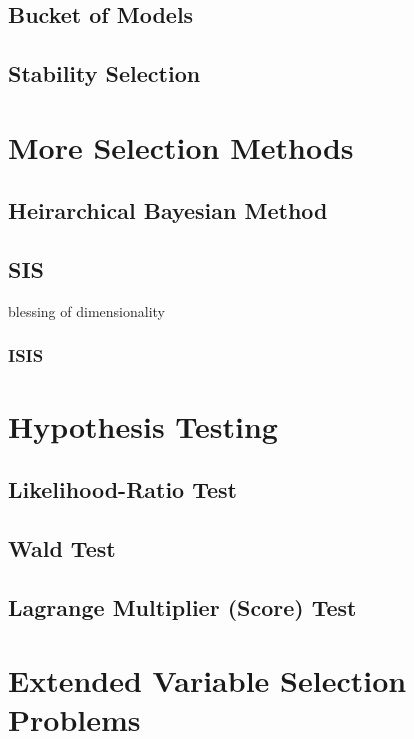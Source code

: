 \subsection{Bucket of Models}
\subsection{Stability Selection}

\section{More Selection Methods}

\subsection{Heirarchical Bayesian Method} 

\subsection{SIS}
blessing of dimensionality 
\subsubsection{ISIS}

\section{Hypothesis Testing}
\subsection{Likelihood-Ratio Test}
\subsection{Wald Test}
\subsection{Lagrange Multiplier (Score) Test}

\section{Extended Variable Selection Problems}

